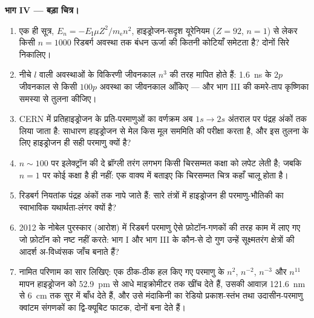 \begin{problem}
\medskip\noindent\textbf{भाग IV --- बड़ा चित्र।}
\begin{enumerate}[resume]
  \item एक ही सूत्र, $E_n = -E_{\text{I}}\mu Z^2/m_{\text{e}}n^2$,
        हाइड्रोजन-सदृश यूरेनियम ($Z = 92$, $n = 1$) से लेकर किसी
        $n = 1000$ रिडबर्ग अवस्था तक बंधन ऊर्जा की कितनी कोटियाँ
        समेटता है? दोनों सिरे निकालिए।
  \item नीचे $l$ वाली अवस्थाओं के विकिरणी जीवनकाल $n^3$ की तरह मापित
        होते हैं: \qty{1.6}{ns} के $2p$ जीवनकाल से किसी
        $100p$ अवस्था का जीवनकाल आँकिए --- और भाग III की
        कमरे-ताप कृष्णिका समस्या से तुलना कीजिए।
  \item CERN में प्रतिहाइड्रोजन के प्रति-परमाणुओं का वर्णक्रम अब
        $1s \to 2s$ अंतराल पर पंद्रह अंकों तक लिया जाता है: साधारण
        हाइड्रोजन से मेल किस मूल सममिति की परीक्षा करता है, और इस
        तुलना के लिए हाइड्रोजन ही सही परमाणु क्यों है?
  \item $n \sim 100$ पर इलेक्ट्रॉन की दे ब्रॉग्ली तरंग लगभग किसी
        चिरसम्मत कक्षा को लपेट लेती है; जबकि $n = 1$ पर कोई कक्षा है
        ही नहीं: एक वाक्य में बताइए कि चिरसम्मत चित्र कहाँ चालू होता
        है।
  \item रिडबर्ग नियतांक पंद्रह अंकों तक नापे जाते हैं: सारे तंत्रों
        में हाइड्रोजन ही परमाणु-भौतिकी का स्वाभाविक यथार्थता-लंगर
        क्यों है?
  \item 2012 के नोबेल पुरस्कार (आरोश) में रिडबर्ग परमाणु ऐसे
        फ़ोटॉन-गणकों की तरह काम में लाए गए जो फ़ोटॉन को नष्ट नहीं
        करते: भाग I और भाग III के कौन-से दो गुण उन्हें
        सूक्ष्मतरंग क्षेत्रों की आदर्श अ-विध्वंसक जाँच बनाते हैं?
  \item नामित परिणाम का सार लिखिए: एक ठीक-ठीक हल किए गए परमाणु के
        $n^2$, $n^{-2}$, $n^{-3}$ और $n^{11}$ मापन
        हाइड्रोजन को \qty{52.9}{pm} से आधे माइक्रोमीटर तक खींच देते
        हैं, उसकी आवाज़ \qty{121.6}{nm} से \qty{6}{cm} तक सुर में
        बाँध देते हैं, और उसे मंदाकिनी का रेडियो प्रकाश-स्तंभ तथा
        उदासीन-परमाणु क्वांटम संगणकों का द्वि-क्यूबिट फाटक, दोनों
        बना देते हैं।
\end{enumerate}
\end{problem}
